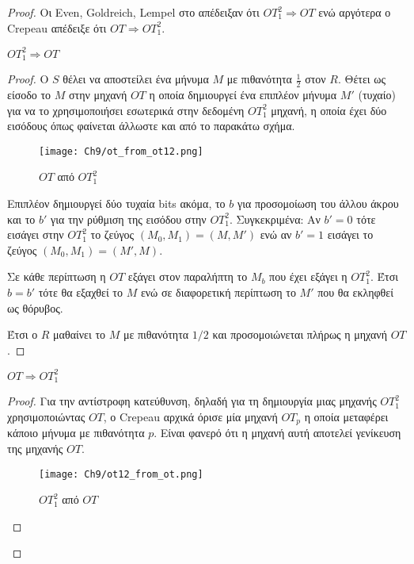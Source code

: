 \begin{proof}
Οι Even, Goldreich, Lempel στο \cite{even_randomized_1985} απέδειξαν ότι $OT_1^2 \Rightarrow OT$ ενώ αργότερα ο Crepeau \cite{crepeau_equivalence_1988} απέδειξε ότι $OT  \Rightarrow OT_1^2$.

\begin{lemma}
$OT_1^2 \Rightarrow OT$
\end{lemma}
\begin{proof}

Ο $S$ θέλει να αποστείλει ένα μήνυμα $M$ με πιθανότητα $\frac{1}{2}$ στον $R$. Θέτει ως είσοδο το $M$ στην μηχανή $OT$ η οποία δημιουργεί ένα επιπλέον μήνυμα $M'$ (τυχαίο) για να το χρησιμοποιήσει εσωτερικά στην δεδομένη $OT_1^2$ μηχανή, η οποία έχει δύο εισόδους όπως φαίνεται άλλωστε και από το παρακάτω σχήμα.

\begin{figure}
	\centering
		\texttt{[image: Ch9/ot\_from\_ot12.png]}
	\caption{$OT$ από $OT_1^2$}
	\label{fig:OTfromOT12}
\end{figure}

Επιπλέον δημιουργεί δύο τυχαία bits ακόμα, το $b$ για προσομοίωση του άλλου άκρου και το $b'$ για την ρύθμιση της εισόδου στην $OT_1^2$. Συγκεκριμένα: Αν $b'=0$ τότε εισάγει στην $OT_1^2$ το ζεύγος $(M_0,M_1)=(M,M')$ ενώ αν $b'=1$ εισάγει το ζεύγος $(M_0,M_1)=(M',M)$. 

Σε κάθε περίπτωση η $OT$ εξάγει στον παραλήπτη το $M_b$ που έχει εξάγει η $OT_1^2$. Έτσι $b=b'$ τότε θα εξαχθεί το $M$ ενώ σε διαφορετική περίπτωση το $M'$ που θα εκληφθεί ως θόρυβος. 

Έτσι ο $R$ μαθαίνει το $M$ με πιθανότητα ${1}/{2}$ και προσομοιώνεται πλήρως η μηχανή $OT$.

\end{proof}
\begin{lemma}
$OT \Rightarrow OT_1^2$
\end{lemma}

\begin{proof}
Για την αντίστροφη κατεύθυνση, δηλαδή για τη δημιουργία μιας μηχανής $OT_1^2$ χρησιμοποιώντας $OT$, ο Crepeau \cite{crepeau_equivalence_1988} αρχικά όρισε μία μηχανή $OT_p$ η οποία μεταφέρει κάποιο μήνυμα με πιθανότητα $p$. Είναι φανερό ότι η μηχανή αυτή αποτελεί γενίκευση της μηχανής $OT$.

\begin{figure}
	\centering
		\texttt{[image: Ch9/ot12\_from\_ot.png]}
	\caption{$OT_1^2$ από $OT$}
	\label{fig:OT12fromOT}
\end{figure}


\end{proof}
\end{proof}
